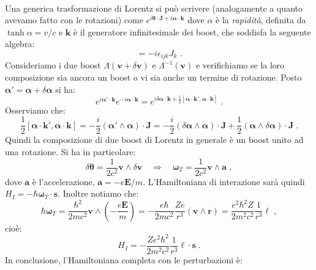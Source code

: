 \documentclass[10pt,a4paper]{report}
\theoremstyle{definition}
\numberwithin{equation}{section}
\begin{document}
\\
Una generica trasformazione di Lorentz si può scrivere (analogamente a quanto avevamo fatto con le rotazioni) come $e^{i\boldsymbol{\theta}\cdot\mathbf{J}+i\boldsymbol{\alpha}\cdot\mathbf{k}}$ dove $\alpha$ è la \textit{rapidità}, definita da $\tanh\alpha= v/c$ e $\mathbf{k}$ è il generatore infinitesimale dei boost, che soddisfa la seguente algebra:
\begin{equation}
[k_i,k_j]=-i\epsilon_{ijk}J_k\;.
\end{equation}
Consideriamo i due boost $\Lambda(\mathbf{v}+\delta\mathbf{v})$ e $\Lambda^{-1}(\mathbf{v})$ e verifichiamo se la loro composizione sia ancora un boost o vi sia anche un termine di rotazione. Posto $\boldsymbol{\alpha}'=\boldsymbol{\alpha}+\delta\boldsymbol{\alpha}$ si ha:
\begin{equation}
e^{i\boldsymbol{\alpha}'\cdot\mathbf{k}}e^{-i\boldsymbol{\alpha}\cdot\mathbf{k}}=e^{i\delta\boldsymbol{\alpha}\cdot\mathbf{k}+\frac{1}{2}[\boldsymbol{\alpha}\cdot\mathbf{k}',\boldsymbol{\alpha}\cdot\mathbf{k}]}\;.
\end{equation}
Osserviamo che:
\begin{equation}
\frac{1}{2}[\boldsymbol{\alpha}\cdot\mathbf{k}',\boldsymbol{\alpha}\cdot\mathbf{k}]=-\frac{i}{2}(\boldsymbol{\alpha}'\wedge\boldsymbol{\alpha})\cdot\mathbf{J}=-\frac{i}{2}(\delta\boldsymbol{\alpha}\wedge\boldsymbol{\alpha})\cdot\mathbf{J}+\frac{1}{2}(\boldsymbol{\alpha}\wedge\delta\boldsymbol{\alpha})\cdot\mathbf{J}\;.
\end{equation}
Quindi la composizione di due boost di Lorentz in generale è un boost unito ad una rotazione. Si ha in particolare:
\begin{equation}
\delta\boldsymbol{\theta}=\frac{1}{2c^2}\mathbf{v}\wedge\delta\mathbf{v}\quad \Longrightarrow \quad \boldsymbol{\omega}_T=\frac{1}{2c^2}\mathbf{v}\wedge\mathbf{a}\;,
\end{equation}
dove $\mathbf{a}$ è l'accelerazione, $\mathbf{a}=-e\mathbf{E}/m$. L'Hamiltoniana di interazione sarà quindi $H_I=-\hbar\boldsymbol{\omega}_T\cdot\mathbf{s}$. Inoltre notiamo che:
$$
\hbar\boldsymbol{\omega}_T=\frac{\hbar^2}{2mc^2}\mathbf{v}\wedge\left(-\frac{e\mathbf{E}}{m}\right)=-\frac{e\hbar}{2mc^2}\frac{Ze}{r^3}(\mathbf{v}\wedge\mathbf{r})=\frac{e^2\hbar^2Z}{2m^2c^2}\frac{1}{r^3}\boldsymbol{\ell}\;,
$$
cioè:
\begin{equation}
H_I=-\frac{Ze^2\hbar^2}{2m^2c^2}\frac{1}{r^3}\boldsymbol{\ell}\cdot\mathbf{s}\;.
\end{equation}
In conclusione, l'Hamiltoniana completa con le perturbazioni è:
\end{document}
